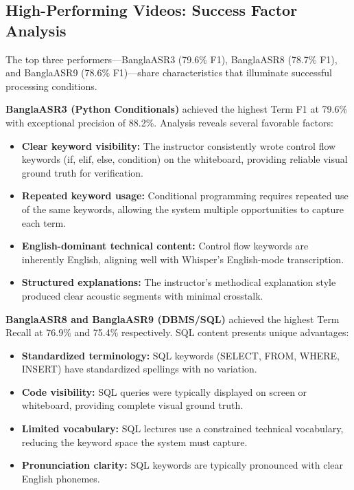 \subsection{High-Performing Videos: Success Factor Analysis}

The top three performers---BanglaASR3 (79.6\% F1), BanglaASR8 (78.7\% F1), and BanglaASR9 (78.6\% F1)---share characteristics that illuminate successful processing conditions.

\textbf{BanglaASR3 (Python Conditionals)} achieved the highest Term F1 at 79.6\% with exceptional precision of 88.2\%. Analysis reveals several favorable factors:

\begin{itemize}
    \item \textbf{Clear keyword visibility:} The instructor consistently wrote control flow keywords (if, elif, else, condition) on the whiteboard, providing reliable visual ground truth for verification.
    \item \textbf{Repeated keyword usage:} Conditional programming requires repeated use of the same keywords, allowing the system multiple opportunities to capture each term.
    \item \textbf{English-dominant technical content:} Control flow keywords are inherently English, aligning well with Whisper's English-mode transcription.
    \item \textbf{Structured explanations:} The instructor's methodical explanation style produced clear acoustic segments with minimal crosstalk.
\end{itemize}

\textbf{BanglaASR8 and BanglaASR9 (DBMS/SQL)} achieved the highest Term Recall at 76.9\% and 75.4\% respectively. SQL content presents unique advantages:

\begin{itemize}
    \item \textbf{Standardized terminology:} SQL keywords (SELECT, FROM, WHERE, INSERT) have standardized spellings with no variation.
    \item \textbf{Code visibility:} SQL queries were typically displayed on screen or whiteboard, providing complete visual ground truth.
    \item \textbf{Limited vocabulary:} SQL lectures use a constrained technical vocabulary, reducing the keyword space the system must capture.
    \item \textbf{Pronunciation clarity:} SQL keywords are typically pronounced with clear English phonemes.
\end{itemize}

